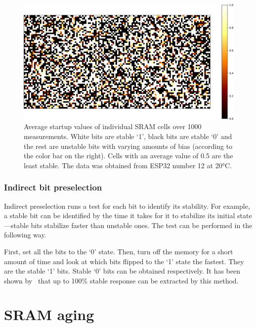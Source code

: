 \begin{figure}[ht!]
    \centering
    \captionsetup{justification=justified,margin=0.5cm}
    \includegraphics[width=\textwidth]{images/bit_stability.png}
    \caption[Average startup values of individual SRAM cells over 1000 measurements]{Average startup values of individual SRAM cells over 1000 measurements. White bits are stable `1', black bits are stable `0' and the rest are unstable bits with varying amounts of bias (according to the color bar on the right). Cells with an average value of 0.5 are the least stable. The data was obtained from ESP32 number 12 at 20°C.}
    \label{fig:bit_stability_mask}
\end{figure}

\subsubsection*{Indirect bit preselection}\label{sec:indirect_bit_preselection}

Indirect preselection runs a test for each bit to identify its stability. For example, a stable bit can be identified by the time it takes for it to stabilize its initial state---stable bits stabilize faster than unstable ones. The test can be performed in the following way.

First, set all the bits to the `0' state. Then, turn off the memory for a short amount of time and look at which bits flipped to the `1' state the fastest. They are the stable `1' bits. Stable `0' bits can be obtained respectively. It has been shown by~\cite{Liu2017} that up to 100\% stable response can be extracted by this method.

\section{SRAM aging}\label{sec:sram_aging}

